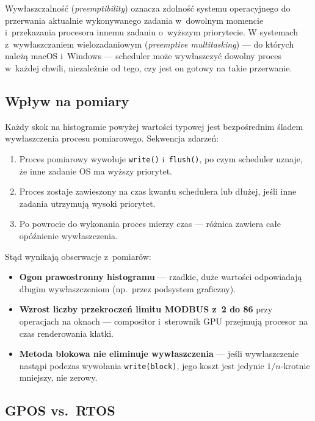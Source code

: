 \documentclass[12pt,a4paper]{article}
\begin{document}
Wywłaszczalność (\textit{preemptibility}) oznacza zdolność systemu operacyjnego do
przerwania aktualnie wykonywanego zadania w~dowolnym momencie i~przekazania procesora
innemu zadaniu o~wyższym priorytecie. W systemach z~wywłaszczaniem wielozadaniowym
(\textit{preemptive multitasking}) — do których należą macOS i~Windows — scheduler może
wywłaszczyć dowolny proces w~każdej chwili, niezależnie od tego, czy jest on gotowy na
takie przerwanie.

\subsection*{Wpływ na pomiary}

Każdy skok na histogramie powyżej wartości typowej jest bezpośrednim śladem
wywłaszczenia procesu pomiarowego. Sekwencja zdarzeń:

\begin{enumerate}
    \item Proces pomiarowy wywołuje \texttt{write()} i~\texttt{flush()}, po czym
          scheduler uznaje, że inne zadanie OS ma wyższy priorytet.
    \item Proces zostaje zawieszony na czas kwantu schedulera lub dłużej,
          jeśli inne zadania utrzymują wysoki priorytet.
    \item Po powrocie do wykonania proces mierzy czas — różnica zawiera całe
          opóźnienie wywłaszczenia.
\end{enumerate}

Stąd wynikają obserwacje z~pomiarów:
\begin{itemize}
    \item \textbf{Ogon prawostronny histogramu} — rzadkie, duże wartości
          odpowiadają długim wywłaszczeniom (np.\ przez podsystem graficzny).
    \item \textbf{Wzrost liczby przekroczeń limitu MODBUS z~2 do 86}
          przy operacjach na oknach — compositor i~sterownik GPU przejmują
          procesor na czas renderowania klatki.
    \item \textbf{Metoda blokowa nie eliminuje wywłaszczenia} — jeśli
          wywłaszczenie nastąpi podczas wywołania \texttt{write(block)},
          jego koszt jest jedynie $1/n$-krotnie mniejszy, nie zerowy.
\end{itemize}

\subsection*{GPOS vs.\ RTOS}
\end{document}
